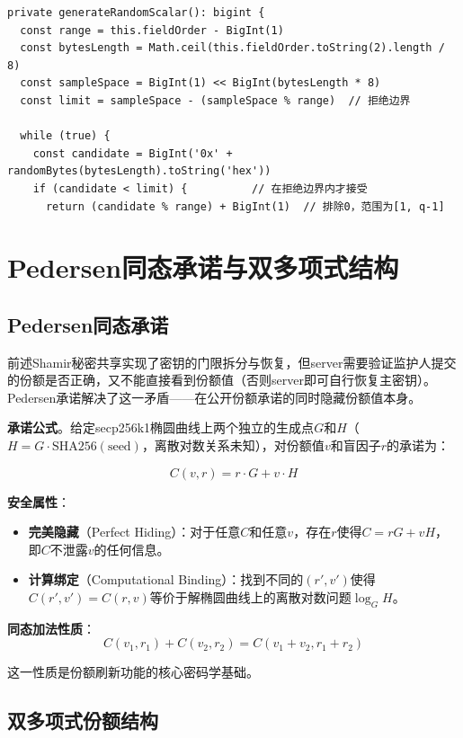 \documentclass[UTF8,a4paper,zihao=-4,openany]{ctexrep}
\begin{document}
\begin{lstlisting}[caption={拒绝采样生成均匀随机标量 (shamir.ts:250-262)}]
private generateRandomScalar(): bigint {
  const range = this.fieldOrder - BigInt(1)
  const bytesLength = Math.ceil(this.fieldOrder.toString(2).length / 8)
  const sampleSpace = BigInt(1) << BigInt(bytesLength * 8)
  const limit = sampleSpace - (sampleSpace % range)  // 拒绝边界

  while (true) {
    const candidate = BigInt('0x' + randomBytes(bytesLength).toString('hex'))
    if (candidate < limit) {          // 在拒绝边界内才接受
      return (candidate % range) + BigInt(1)  // 排除0，范围为[1, q-1]
\end{lstlisting}

\section{Pedersen同态承诺与双多项式结构}

\subsection{Pedersen同态承诺}

前述Shamir秘密共享实现了密钥的门限拆分与恢复，但server需要验证监护人提交的份额是否正确，又不能直接看到份额值（否则server即可自行恢复主密钥）。Pedersen承诺解决了这一矛盾——在公开份额承诺的同时隐藏份额值本身。

\noindent \textbf{承诺公式}。给定secp256k1椭圆曲线上两个独立的生成点$G$和$H$（$H = G \cdot \text{SHA256}(\text{seed})$，离散对数关系未知），对份额值$v$和盲因子$r$的承诺为：

\[
C(v, r) = r \cdot G + v \cdot H
\]

\noindent \textbf{安全属性}：
\begin{itemize}
  \item \textbf{完美隐藏}（Perfect Hiding）：对于任意$C$和任意$v$，存在$r$使得$C = rG + vH$，即$C$不泄露$v$的任何信息。
  \item \textbf{计算绑定}（Computational Binding）：找到不同的$(r', v')$使得$C(r', v') = C(r, v)$等价于解椭圆曲线上的离散对数问题$\log_G H$。
\end{itemize}

\noindent \textbf{同态加法性质}：
\[
C(v_1, r_1) + C(v_2, r_2) = C(v_1 + v_2, r_1 + r_2)
\]

这一性质是份额刷新功能的核心密码学基础。

\subsection{双多项式份额结构}
\end{document}

